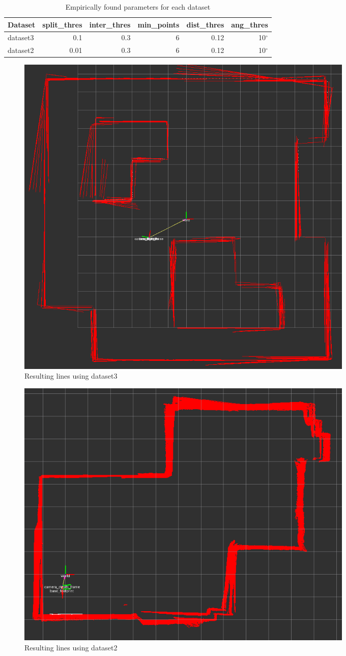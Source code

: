 \documentclass[11pt,oneside,a4paper]{article}
\begin{document}
\begin{table}[H]
	\begin{tabular}{l | r r r r r}\label{table1}
	Dataset & split\_thres & inter\_thres & min\_points & dist\_thres & ang\_thres \\
	\hline
	dataset3 & 0.1 & 0.3 & 6 & 0.12 & 10$^{\circ}$ \\
	dataset2 & 0.01 & 0.3 & 6 & 0.12 & 10$^{\circ}$ \\
	
	\end{tabular}
	\caption{Empirically found parameters for each dataset}
\end{table}

\begin{figure}
	\centering
	\includegraphics[width=0.8\textwidth]{figures/dataset3.png}
	\caption{Resulting lines using dataset3}
	\label{dataset3}
\end{figure}

\begin{figure}
	\centering
	\includegraphics[width=0.8\textwidth]{figures/dataset2.png}
	\caption{Resulting lines using dataset2}
	\label{dataset2}
\end{figure}
\end{document}
